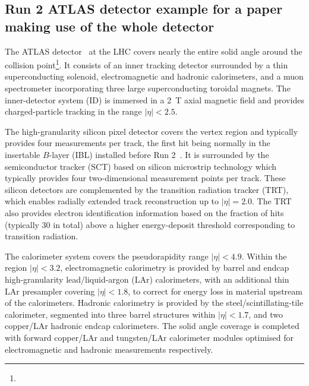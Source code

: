 \subsection{Run 2 ATLAS detector example for a paper making use of the whole detector}
\label{sec:atlas2}

The ATLAS detector~\cite{PERF-2007-01} at the LHC covers nearly the entire solid angle around the collision point\footnote{\AtlasCoordFootnote}.
It consists of an inner tracking detector surrounded by a thin superconducting solenoid, electromagnetic and hadronic calorimeters,
and a muon spectrometer incorporating three large superconducting toroidal magnets.
The inner-detector system (ID) is immersed in a \SI{2}{\tesla} axial magnetic field 
and provides charged-particle tracking in the range \(|\eta| < 2.5\).

The high-granularity silicon pixel detector covers the vertex region and typically provides four measurements per track, 
the first hit being normally in the insertable $B$-layer (IBL) installed before Run 2~\cite{ATLAS-TDR-19,Abbott:2018ikt}.
It is surrounded by the semiconductor tracker (SCT) based on silicon microstrip technology which typically provides four two-dimensional measurement points per track.
These silicon detectors are complemented by the transition radiation tracker (TRT),
which enables radially extended track reconstruction up to \(|\eta| = 2.0\). 
The TRT also provides electron identification information 
based on the fraction of hits (typically 30 in total) above a higher energy-deposit threshold corresponding to transition radiation.

The calorimeter system covers the pseudorapidity range \(|\eta| < 4.9\).
Within the region \(|\eta|< 3.2\), electromagnetic calorimetry is provided by barrel and 
endcap high-granularity lead/liquid-argon (LAr) calorimeters,
with an additional thin LAr presampler covering \(|\eta| < 1.8\),
to correct for energy loss in material upstream of the calorimeters.
Hadronic calorimetry is provided by the steel/scintillating-tile calorimeter,
segmented into three barrel structures within \(|\eta| < 1.7\), and two copper/LAr hadronic endcap calorimeters.
The solid angle coverage is completed with forward copper/LAr and tungsten/LAr calorimeter modules
optimised for electromagnetic and hadronic measurements respectively.

